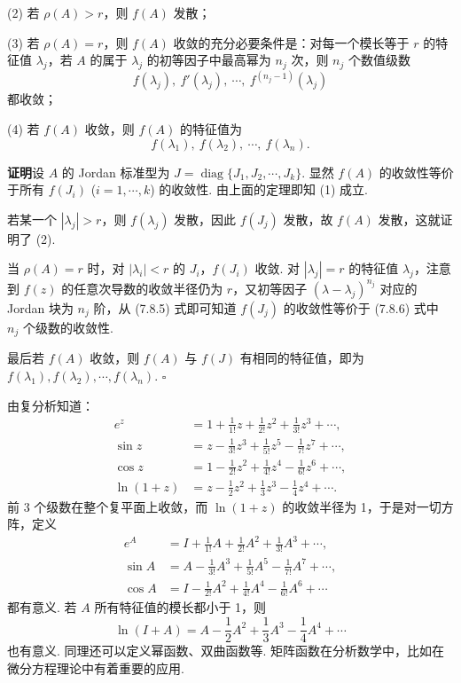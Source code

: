 \documentclass[UTF8,12pt,a4paper,fontset=fandol]{ctexart}
\begin{document}
(2) 若 $\rho(A)>r$，则 $f(A)$ 发散；

(3) 若 $\rho(A)=r$，则 $f(A)$ 收敛的充分必要条件是：对每一个模长等于 $r$ 的特征值 $\lambda_j$，若 $A$ 的属于 $\lambda_j$ 的初等因子中最高幂为 $n_j$ 次，则 $n_j$ 个数值级数
\begin{equation}
f(\lambda_j),\ f'(\lambda_j),\ \cdots,\ f^{(n_j-1)}(\lambda_j)
\tag{7.8.6}
\end{equation}
都收敛；

(4) 若 $f(A)$ 收敛，则 $f(A)$ 的特征值为
\[
f(\lambda_1),\ f(\lambda_2),\ \cdots,\ f(\lambda_n).
\]

\noindent\textbf{证明}\quad 设 $A$ 的 Jordan 标准型为 $J=\operatorname{diag}\{J_1,J_2,\cdots,J_k\}$. 显然 $f(A)$ 的收敛性等价于所有 $f(J_i)$ ($i=1,\cdots,k$) 的收敛性. 由上面的定理即知 (1) 成立.

若某一个 $|\lambda_j|>r$，则 $f(\lambda_j)$ 发散，因此 $f(J_j)$ 发散，故 $f(A)$ 发散，这就证明了 (2).

当 $\rho(A)=r$ 时，对 $|\lambda_i|<r$ 的 $J_i$，$f(J_i)$ 收敛. 对 $|\lambda_j|=r$ 的特征值 $\lambda_j$，注意到 $f(z)$ 的任意次导数的收敛半径仍为 $r$，又初等因子 $(\lambda-\lambda_j)^{n_j}$ 对应的 Jordan 块为 $n_j$ 阶，从 (7.8.5) 式即可知道 $f(J_j)$ 的收敛性等价于 (7.8.6) 式中 $n_j$ 个级数的收敛性.

最后若 $f(A)$ 收敛，则 $f(A)$ 与 $f(J)$ 有相同的特征值，即为 $f(\lambda_1),f(\lambda_2),\cdots,f(\lambda_n)$. $\square$

由复分析知道：
\[
\begin{aligned}
e^z&=1+\frac1{1!}z+\frac1{2!}z^2+\frac1{3!}z^3+\cdots,\\
\sin z&=z-\frac1{3!}z^3+\frac1{5!}z^5-\frac1{7!}z^7+\cdots,\\
\cos z&=1-\frac1{2!}z^2+\frac1{4!}z^4-\frac1{6!}z^6+\cdots,\\
\ln(1+z)&=z-\frac12z^2+\frac13z^3-\frac14z^4+\cdots.
\end{aligned}
\]
前 3 个级数在整个复平面上收敛，而 $\ln(1+z)$ 的收敛半径为 1，于是对一切方阵，定义
\[
\begin{aligned}
e^A&=I+\frac1{1!}A+\frac1{2!}A^2+\frac1{3!}A^3+\cdots,\\
\sin A&=A-\frac1{3!}A^3+\frac1{5!}A^5-\frac1{7!}A^7+\cdots,\\
\cos A&=I-\frac1{2!}A^2+\frac1{4!}A^4-\frac1{6!}A^6+\cdots
\end{aligned}
\]
都有意义. 若 $A$ 所有特征值的模长都小于 1，则
\[
\ln(I+A)=A-\frac12A^2+\frac13A^3-\frac14A^4+\cdots
\]
也有意义. 同理还可以定义幂函数、双曲函数等. 矩阵函数在分析数学中，比如在微分方程理论中有着重要的应用.
\end{document}
